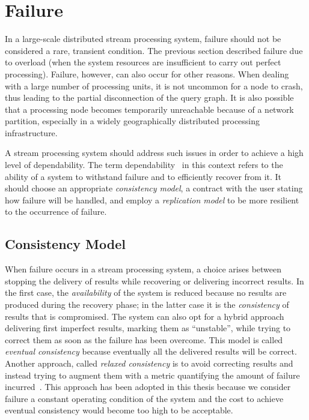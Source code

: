 \section{Failure}

In a large-scale distributed stream processing system, failure should not be considered a rare, transient
condition. The previous section described failure due to overload (\ie when the system resources are
insufficient to carry out perfect processing). Failure, however, can also occur for other reasons.
When dealing with a large number of processing units, it is not uncommon for a node to crash, thus leading to
the partial disconnection of the query graph. It is also possible that a processing node becomes
temporarily unreachable because of a network partition, especially in a widely geographically distributed processing
infrastructure. 

A stream processing system should address such issues in order to achieve a high level of dependability.
The term dependability~\cite{dependability} in this context refers to the ability of a system to
withstand failure and to efficiently recover from it. It should choose an appropriate \emph{consistency
model}, a contract with the user stating how failure will be handled, and employ a \emph{replication
model} to be more resilient to the occurrence of failure.

\subsection*{Consistency Model}
When failure occurs in a stream processing system, a choice arises between stopping the delivery of
results while recovering or delivering incorrect results. In the first case, the \emph{availability} of
the system is reduced because no results are produced during the recovery phase; in the latter case it
is the \emph{consistency} of results that is compromised. The system can also opt for a hybrid
approach~\cite{availability-consistency} delivering first imperfect results, marking them as
``unstable'', while trying to correct them as soon as the failure has been overcome. This model is called
\emph{eventual consistency} because eventually all the delivered results will be correct.
Another approach, called \emph{relaxed consistency} is to avoid correcting results and instead trying to
augment them with a metric quantifying the amount of failure incurred~\cite{dependable-is-sensing}.
This approach has been adopted in this thesis because we consider failure a constant
operating condition of the system and the cost to achieve eventual consistency would become too high to
be acceptable.
			
